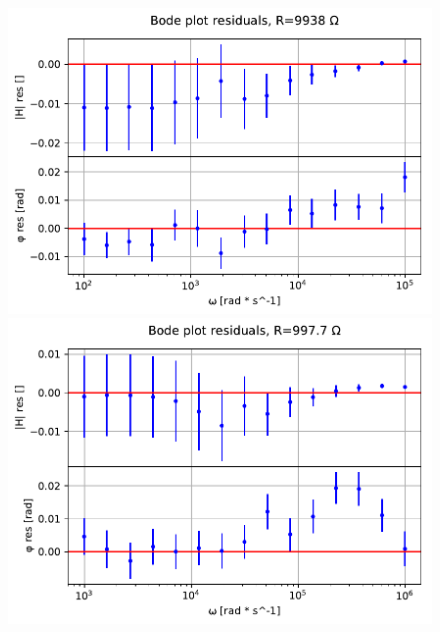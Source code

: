 \documentclass{article}
\begin{document}
\begin{figure}[H]
    \centering
    \begin{minipage}{0.5\textwidth}
        \centering
        \includegraphics[width=\textwidth]{bodeplot_res1.pdf} 
    \end{minipage}\hfill
    \begin{minipage}{0.5\textwidth}
        \centering
        \includegraphics[width=\textwidth]{bodeplot_res2.pdf} 
    \end{minipage}
    \\
    \centering
    \begin{minipage}{0.5\textwidth}
        \centering

\end{minipage}
\end{figure}
\end{document}
